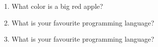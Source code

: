 \documentclass[12pt,onside,a4paper,article]{memoir}
\begin{document}
\begin{enumerate}
\item{What color is a big red apple?}
\begin{flushright}
\end{flushright}
\item{What is your favourite programming language?}
\begin{flushright}
\end{flushright}
\item{What is your favourite programming language?}
\begin{flushright}
\end{flushright}
\end{enumerate}

\vspace*{4.5cm}
\begin{flushright}
 \end{flushright}
\end{document}
